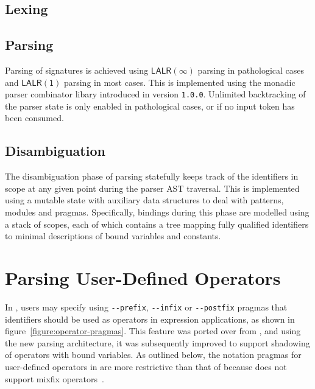 \subsection{Lexing}


\subsection{Parsing}

Parsing of \Beluga signatures is achieved using $ \mathsf{LALR(\infty)} $ parsing in pathological cases and $ \mathsf{LALR(1)} $ parsing in most cases.
This is implemented using the monadic parser combinator libary introduced in \Beluga version \texttt{1.0.0}.
Unlimited backtracking of the parser state is only enabled in pathological cases, or if no input token has been consumed.


\subsection{Disambiguation}

The disambiguation phase of parsing statefully keeps track of the identifiers in scope at any given point during the parser \ac{AST} traversal.
This is implemented using a mutable state with auxiliary data structures to deal with patterns, modules and pragmas.
Specifically, bindings during this phase are modelled using a stack of scopes, each of which contains a tree mapping fully qualified identifiers to minimal descriptions of bound variables and constants.


\section{Parsing User-Defined Operators}

In \Beluga, users may specify using \verb|--prefix|, \verb|--infix| or \verb|--postfix| pragmas that identifiers should be used as operators in expression applications, as shown in figure~\ref{figure:operator-pragmas}.
This feature was ported over from \Twelf, and using the new parsing architecture, it was subsequently improved to support shadowing of operators with bound variables.
As outlined below, the notation pragmas for user-defined operators in \Beluga are more restrictive than that of \Agda because \Beluga does not support mixfix operators~\cite{danielsson2008parsing}.

